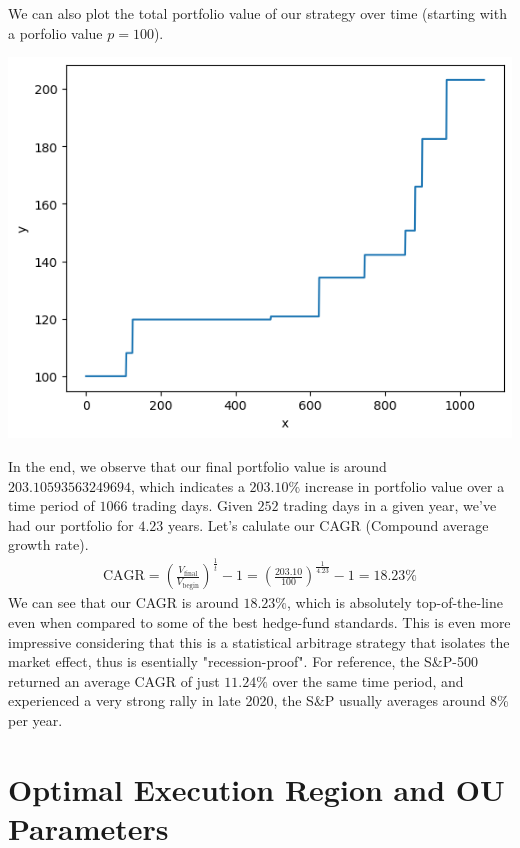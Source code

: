 \documentclass{article}
\begin{document}
\begin{spacing}{2.0}
\begin{center}
\end{center}
We can also plot the total portfolio value of our strategy over time (starting with a porfolio value $p=100$).
\begin{center}
    \includegraphics[scale=0.33]{./images/backtest_portfolio_value_1.png}
\end{center}
In the end, we observe that our final portfolio value is around $203.10593563249694$, which indicates a $203.10\%$ increase in portfolio value over a time period of $1066$ trading days.
Given $252$ trading days in a given year, we've had our portfolio for $4.23$ years. Let's calulate our CAGR (Compound average growth rate).
\begin{gather*}
    \text{CAGR} = \left ( \frac{V_{\text{final}}}{V_{\text{begin}}} \right )^{\frac{1}{t}} - 1 = \left ( \frac{203.10}{100} \right )^{\frac{1}{4.23}} - 1 = 18.23 \%
\end{gather*}
We can see that our CAGR is around $18.23 \%$, which is absolutely top-of-the-line even when compared to some of the best hedge-fund standards. This is even more impressive considering
that this is a statistical arbitrage strategy that isolates the market effect, thus is esentially "recession-proof". For reference, the S\&P-500 returned an average CAGR of just
$11.24 \%$ over the same time period, and experienced a very strong rally in late 2020, the S\&P usually averages around 8\% per year.

\section{Optimal Execution Region and OU Parameters}

\end{spacing}
\end{document}
